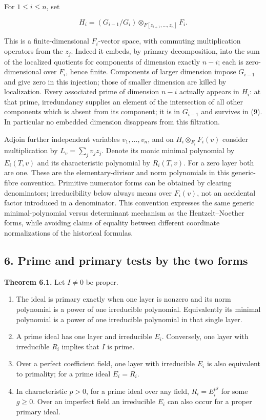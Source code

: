 \documentclass[
]{article}
\providecommand{\tightlist}{%
  \setlength{\itemsep}{0pt}\setlength{\parskip}{0pt}}
\begin{document}
For \(1\le i\le n\), set

\[
H_i=(G_{i-1}/G_i)\otimes_{F[z_{i+1},\ldots,z_n]}F_i.
\tag{9}
\]

This is a finite-dimensional \(F_i\)-vector space, with commuting
multiplication operators from the \(z_j\). Indeed it embeds, by primary
decomposition, into the sum of the localized quotients for components of
dimension exactly \(n-i\); each is zero-dimensional over \(F_i\), hence
finite. Components of larger dimension impose \(G_{i-1}\) and give zero
in this injection; those of smaller dimension are killed by
localization. Every associated prime of dimension \(n-i\) actually
appears in \(H_i\): at that prime, irredundancy supplies an element of
the intersection of all other components which is absent from its
component; it is in \(G_{i-1}\) and survives in (9). In particular no
embedded dimension disappears from this filtration.

Adjoin further independent variables \(v_1,\ldots,v_n\), and on
\(H_i\otimes_{F_i}F_i(v)\) consider multiplication by
\(L_v=\sum_jv_jz_j\). Denote its monic minimal polynomial by
\(E_i(T,v)\) and its characteristic polynomial by \(R_i(T,v)\). For a
zero layer both are one. These are the elementary-divisor and norm
polynomials in this generic-fibre convention. Primitive numerator forms
can be obtained by clearing denominators; irreducibility below always
means over \(F_i(v)\), not an accidental factor introduced in a
denominator. This convention expresses the same generic
minimal-polynomial versus determinant mechanism as the Hentzelt--Noether
forms, while avoiding claims of equality between different coordinate
normalizations of the historical formulas.

\subsection{6. Prime and primary tests by the two
forms}\label{prime-and-primary-tests-by-the-two-forms}

\textbf{Theorem 6.1.} Let \(I\ne0\) be proper.

\begin{enumerate}
\def\labelenumi{\arabic{enumi}.}
\tightlist
\item
  The ideal is primary exactly when one layer is nonzero and its norm
  polynomial is a power of one irreducible polynomial. Equivalently its
  minimal polynomial is a power of one irreducible polynomial in that
  single layer.
\item
  A prime ideal has one layer and irreducible \(E_i\). Conversely, one
  layer with irreducible \(R_i\) implies that \(I\) is prime.
\item
  Over a perfect coefficient field, one layer with irreducible \(E_i\)
  is also equivalent to primality; for a prime ideal \(E_i=R_i\).
\item
  In characteristic \(p>0\), for a prime ideal over any field,
  \(R_i=E_i^{p^g}\) for some \(g\ge0\). Over an imperfect field an
  irreducible \(E_i\) can also occur for a proper primary ideal.
\end{enumerate}
\end{document}
